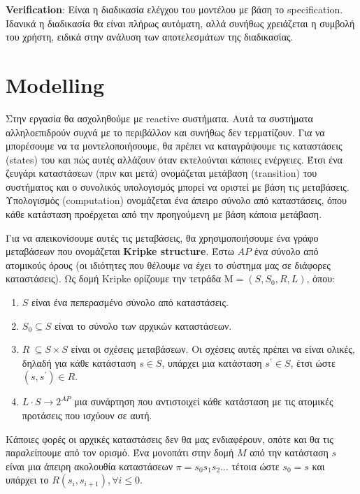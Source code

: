 \documentclass{article}
\newcommand{\english}[1]{\foreignlanguage{english}{{#1}}}
\begin{document}
\english{\textbf{Verification}}: Είναι η διαδικασία ελέγχου του μοντέλου με βάση το \english{specification}. Ιδανικά η διαδικασία θα είναι πλήρως αυτόματη, αλλά συνήθως χρειάζεται η συμβολή του χρήστη, ειδικά στην ανάλυση των αποτελεσμάτων της διαδικασίας. 

\section*{\english{Modelling}}

Στην εργασία θα ασχοληθούμε με \english{reactive} συστήματα. Αυτά τα συστήματα αλληλοεπιδρούν συχνά με το περιβάλλον και συνήθως δεν τερματίζουν. Για να μπορέσουμε να τα μοντελοποιήσουμε, θα πρέπει να καταγράψουμε τις καταστάσεις \english{(states)} του και πώς αυτές αλλάζουν όταν εκτελούνται κάποιες ενέργειες. Έτσι ένα ζευγάρι καταστάσεων (πριν και μετά) ονομάζεται μετάβαση \english{(transition)} του συστήματος και ο συνολικός υπολογισμός μπορεί να οριστεί με βάση τις μεταβάσεις. Υπολογισμός  \english{(computation)} ονομάζεται ένα άπειρο σύνολο από καταστάσεις, όπου κάθε κατάσταση προέρχεται από την προηγούμενη με βάση κάποια μετάβαση.

Για να απεικονίσουμε αυτές τις μεταβάσεις, θα χρησιμοποιήσουμε ένα γράφο μεταβάσεων που ονομάζεται \english{\textbf{Kripke structure}}.
Έστω $AP$ ένα σύνολο από ατομικούς όρους (οι ιδιότητες που θέλουμε να έχει το σύστημα μας σε διάφορες καταστάσεις). Ως δομή \english{Kripke} ορίζουμε την τετράδα M$=\left(S,S_0,R,L\right)$, όπου:
\begin{enumerate}
    \item $S$ είναι ένα πεπερασμένο σύνολο από καταστάσεις.
    \item $S_0\subseteq S$ είναι το σύνολο των αρχικών καταστάσεων.
    \item 	$R\ \subseteq S \times S$ είναι οι σχέσεις μεταβάσεων. Οι σχέσεις αυτές πρέπει να είναι ολικές, δηλαδή για κάθε κατάσταση $s \in S$, υπάρχει μια κατάσταση $s^\prime\in S$,  έτσι ώστε $\left(s,s^\prime \right ) \in R$.
    \item $L \cdot S \rightarrow 2^{AP}$ μια συνάρτηση που αντιστοιχεί κάθε κατάσταση με τις ατομικές προτάσεις που ισχύουν σε αυτή.
\end{enumerate}    
	

Κάποιες φορές οι αρχικές καταστάσεις δεν θα μας ενδιαφέρουν, οπότε και θα τις παραλείπουμε από τον ορισμό. Ένα μονοπάτι στην δομή $M$ από την κατάσταση $s$ είναι μια άπειρη ακολουθία καταστάσεων $\pi = s_0 s_1 s_2 \ldots$ τέτοια ώστε $s_0 = s$ και υπάρχει το $R\left(s_i,s_{i+1}\right),\forall i \leq 0$.
\end{document}

